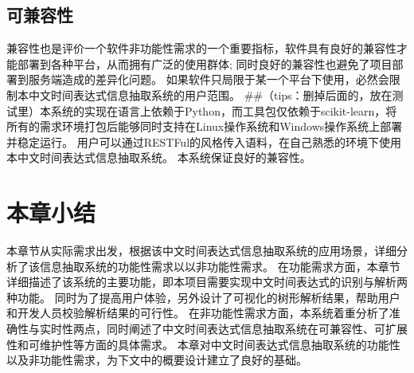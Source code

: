 \subsection{可兼容性}

兼容性也是评价一个软件非功能性需求的一个重要指标，软件具有良好的兼容性才能部署到各种平台，从而拥有广泛的使用群体; 同时良好的兼容性也避免了项目部署到服务端造成的差异化问题。
如果软件只局限于某一个平台下使用，必然会限制本中文时间表达式信息抽取系统的用户范围。 ##（tips：删掉后面的，放在测试里）本系统的实现在语言上依赖于Python，而工具包仅依赖于scikit-learn，将所有的需求环境打包后能够同时支持在Linux操作系统和Windows操作系统上部署并稳定运行。 用户可以通过RESTFul的风格传入语料，在自己熟悉的环境下使用本中文时间表达式信息抽取系统。 本系统保证良好的兼容性。

\section{本章小结}

本章节从实际需求出发，根据该中文时间表达式信息抽取系统的应用场景，详细分析了该信息抽取系统的功能性需求以以非功能性需求。
在功能需求方面，本章节详细描述了该系统的主要功能，即本项目需要实现中文时间表达式的识别与解析两种功能。 
同时为了提高用户体验，另外设计了可视化的树形解析结果，帮助用户和开发人员校验解析结果的可行性。
在非功能性需求方面，本系统着重分析了准确性与实时性两点，同时阐述了中文时间表达式信息抽取系统在可兼容性、可扩展性和可维护性等方面的具体需求。
本章对中文时间表达式信息抽取系统的功能性以及非功能性需求，为下文中的概要设计建立了良好的基础。


